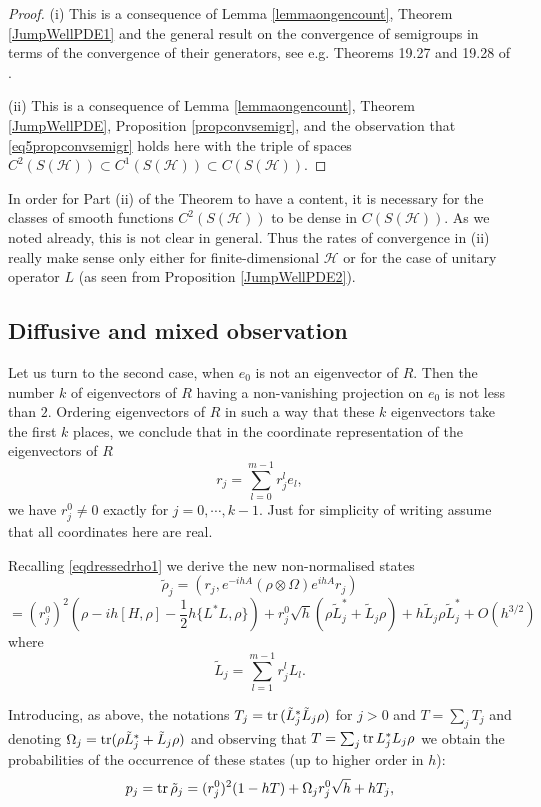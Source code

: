 \documentclass[12pt]{article}
\def\HC{\mathcal{H}}
\def\tr{\rm{tr}}
\newcommand{\Om}{\Omega}
\begin{document}
\begin{proof}
(i) This is a consequence of Lemma \ref{lemmaongencount}, Theorem \ref{JumpWellPDE1}
 and the general result on the convergence
of semigroups in terms of the convergence of their generators, see e.g. Theorems 19.27 and  19.28 of \cite{Kallen}.

(ii) This is a consequence of Lemma \ref{lemmaongencount}, Theorem \ref{JumpWellPDE}, Proposition \ref{propconvsemigr},
and the observation that \eqref{eq5propconvsemigr}
holds here with  the triple of spaces $C^2(S(\HC))\subset C^1(S(\HC)) \subset C(S(\HC))$.
\end{proof}

In order for Part (ii) of the Theorem to have a content, it is necessary for the classes
of smooth functions  $C^2(S(\HC))$  to be dense in $C(S(\HC))$. As we noted already, this is not clear in general.
Thus the rates of convergence in (ii) really make sense only either for finite-dimensional $\HC$ or for the case
of unitary operator $L$ (as seen from Proposition \ref{JumpWellPDE2}).


\subsection{Diffusive and mixed observation}
\label{secdifcase}

Let us turn to the second case, when $e_0$ is not an eigenvector of $R$.
Then the number $k$ of eigenvectors of $R$ having a non-vanishing projection
on $e_0$ is not less than $2$. Ordering eigenvectors of $R$ in such a way that
these $k$ eigenvectors take the first $k$ places, we conclude that in the
coordinate representation of the eigenvectors of $R$
\[
r_j=\sum_{l=0}^{m-1} r_j^l e_l,
\]
we have $r_j^0\neq 0$ exactly for $j=0, \cdots, k-1$.
Just for simplicity of writing assume that all coordinates here are real.

Recalling \eqref{eqdressedrho1} we derive the
new non-normalised states
\[
\tilde \rho_j =(r_j, e^{-ihA} (\rho\otimes \Om) e^{ihA} r_j)
\]
\[
=(r_j^0)^2 (\rho -ih[H, \rho] -\frac12 h\{L^*L,\rho\})
+r^0_j \sqrt h (\rho \tilde L_j^*+\tilde L_j \rho)+h\tilde L_j \rho \tilde L_j^*
+O(h^{3/2})
\]
where
\[
\tilde L_j= \sum_{l=1}^{m-1} r^l_j L_l.
\]

Introducing, as above, the notations $T_j={\tr}\, (\tilde L_j^* \tilde L_j \rho)$ for $j>0$ and $T=\sum_j T_j$
and denoting $\Om_j=  {\tr} (\rho \tilde L_j^* + \tilde L_j\rho)$ and observing that
$T=\sum_j {\tr} \, L_j^* L_j\rho $ we obtain
the probabilities of the occurrence of these states (up to higher order in $h$):
\[
p_j={\tr} \, \tilde \rho_j=(r_j^0)^2  (1-hT)+\Om_j r^0_j \sqrt h  +h T_j,
\]
\end{document}
